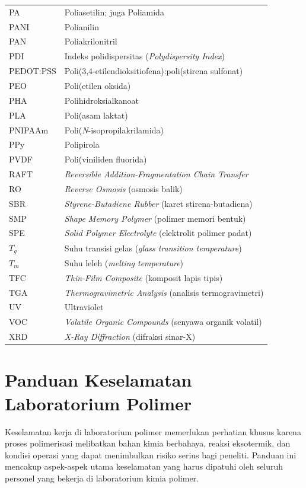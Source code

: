 \documentclass[12pt,a4paper,openany]{book}
\begin{document}
\begin{longtable}{p{3cm}p{9cm}}
PA & Poliasetilin; juga Poliamida \\
PANI & Polianilin \\
PAN & Poliakrilonitril \\
PDI & Indeks polidispersitas (\textit{Polydispersity Index}) \\
PEDOT:PSS & Poli(3,4-etilendioksitiofena):poli(stirena sulfonat) \\
PEO & Poli(etilen oksida) \\
PHA & Polihidroksialkanoat \\
PLA & Poli(asam laktat) \\
PNIPAAm & Poli(\textit{N}-isopropilakrilamida) \\
PPy & Polipirola \\
PVDF & Poli(viniliden fluorida) \\
RAFT & \textit{Reversible Addition-Fragmentation Chain Transfer} \\
RO & \textit{Reverse Osmosis} (osmosis balik) \\
SBR & \textit{Styrene-Butadiene Rubber} (karet stirena-butadiena) \\
SMP & \textit{Shape Memory Polymer} (polimer memori bentuk) \\
SPE & \textit{Solid Polymer Electrolyte} (elektrolit polimer padat) \\
$T_g$ & Suhu transisi gelas (\textit{glass transition temperature}) \\
$T_m$ & Suhu leleh (\textit{melting temperature}) \\
TFC & \textit{Thin-Film Composite} (komposit lapis tipis) \\
TGA & \textit{Thermogravimetric Analysis} (analisis termogravimetri) \\
UV & Ultraviolet \\
VOC & \textit{Volatile Organic Compounds} (senyawa organik volatil) \\
XRD & \textit{X-Ray Diffraction} (difraksi sinar-X) \\

\end{longtable}

\chapter{Panduan Keselamatan Laboratorium Polimer}

Keselamatan kerja di laboratorium polimer memerlukan perhatian khusus karena proses polimerisasi melibatkan bahan kimia berbahaya, reaksi eksotermik, dan kondisi operasi yang dapat menimbulkan risiko serius bagi peneliti. Panduan ini mencakup aspek-aspek utama keselamatan yang harus dipatuhi oleh seluruh personel yang bekerja di laboratorium kimia polimer.
\end{document}

